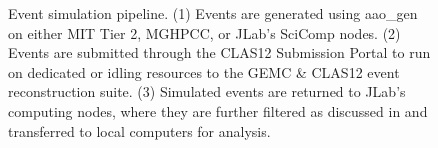     \begin{figure}
        \centering
        \caption[Event Simulation Pipeline]{Event simulation pipeline. (1) Events are generated using aao\_gen on either MIT Tier 2, MGHPCC, or JLab's SciComp nodes. (2) Events are submitted through the CLAS12 Submission Portal to run on dedicated or idling resources to the GEMC \& CLAS12 event reconstruction suite. (3) Simulated events are returned to JLab's computing nodes, where they are further filtered as discussed in  and transferred to local computers for analysis.}
        \label{fig:simulation_workflow}
    \end{figure}


    

   
    






    




    
    
    
    

    
    





 

    
    
    


